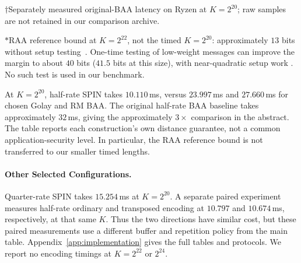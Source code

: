 \begin{table}[tb]
\centering
\caption{Same-host transposed-encoder latency in milliseconds.
Entries are medians of three process medians, with no input resets,
except for the separate approximate reference marked $\dagger$.
The pair $(\delta,\lambda)$ gives the relative distance and margin
in bits at the largest listed length, except for the RAA reference marked
$*$ below; -- denotes an unassigned bound.
EC uses the older, weaker distance and margin target.}
\label{tab:transposed-comparison}
\small
\setlength{\tabcolsep}{3pt}

\par\smallskip
\begin{minipage}{\linewidth}
\footnotesize
$\dagger$Separately measured original-BAA latency on Ryzen at $K=2^{20}$;
raw samples are not retained in our comparison archive.
\par
$*$RAA reference bound at $K=2^{22}$, not the timed $K=2^{20}$:
approximately $13$ bits without setup testing~\cite[Sec.~3.1]{blaze25}.
One-time testing of low-weight messages can improve the margin to about
$40$ bits ($41.5$ bits at this size), with near-quadratic setup work
\cite[Fig.~2]{blaze25}. No such test is used in our benchmark.
\end{minipage}
\end{table}

At $K=2^{20}$, half-rate SPIN takes $10.110$\,ms, versus $23.997$\,ms
and $27.660$\,ms for chosen Golay and RM BAA.
The original half-rate BAA baseline takes approximately $32$\,ms,
giving the approximately $3\times$ comparison in the abstract.
The table reports each construction's own distance guarantee, not a
common application-security level. In particular, the RAA reference
bound is not transferred to our smaller timed lengths.

\paragraph{Other Selected Configurations.}
Quarter-rate SPIN takes $15.254$\,ms at $K=2^{20}$.
A separate paired experiment measures half-rate ordinary and transposed
encoding at $10.797$ and $10.674$\,ms, respectively, at that same $K$.
Thus the two directions have similar cost, but these paired measurements
use a different buffer and repetition policy from the main table.
Appendix~\ref{app:implementation} gives the full tables and protocols.
We report no encoding timings at $K=2^{22}$ or $2^{24}$.

